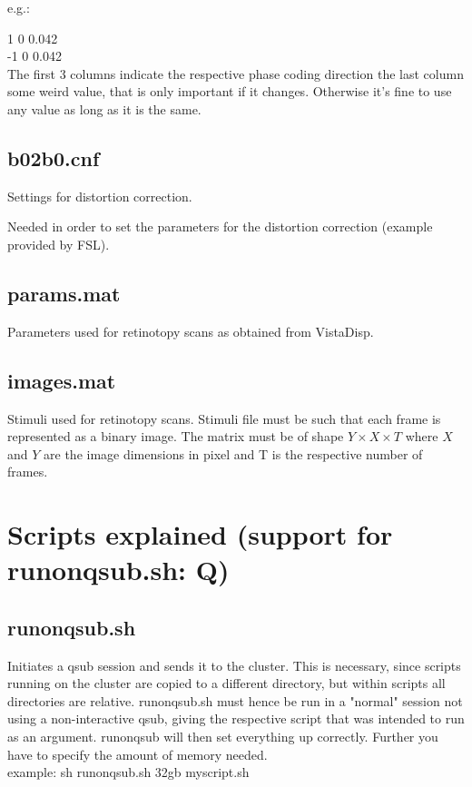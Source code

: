 \documentclass[12pt,a4paper]{scrartcl}
\begin{document}
\noindent e.g.:

 1 0 0.042\\
 -1 0 0.042\\

The first 3 columns indicate the respective phase coding direction the last column some weird value, that is only important if it changes. Otherwise it's fine to use any value as long as it is the same.

\subsection{b02b0.cnf}
Settings for distortion correction.

Needed in order to set the parameters for the distortion correction (example provided by FSL).

\subsection{params.mat}
Parameters used for retinotopy scans as obtained from VistaDisp.

\subsection{images.mat}
Stimuli used for retinotopy scans. Stimuli file must be such that each frame is represented as a binary image. The matrix must be of shape $Y \times X \times T$ where $X$ and $Y$ are the image dimensions in pixel and T is the respective number of frames.

\section{Scripts explained (support for runonqsub.sh: Q)}
\subsection{runonqsub.sh}
Initiates a qsub session and sends it to the cluster. This is necessary, since scripts running on the cluster are copied to a different directory, but within scripts all directories are relative. runonqsub.sh must hence be run in a "normal" session not using a non-interactive qsub, giving the respective script that was intended to run as an argument. runonqsub will then set everything up correctly. Further you have to specify the amount of memory needed.\\

example: sh runonqsub.sh 32gb myscript.sh\\
\end{document}
